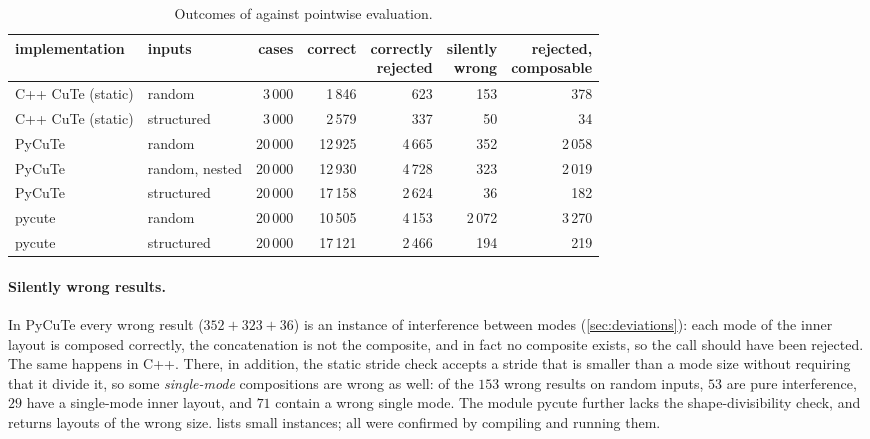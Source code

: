 \begin{table}[t]\centering\small
\begin{tabular}{@{}llrrrrr@{}}
\toprule
implementation & inputs & cases & correct & \shortstack{correctly\\rejected} & \shortstack{silently\\wrong} & \shortstack{rejected,\\composable}\\
\midrule
C++ CuTe (static) & random & 3\,000 & 1\,846 & 623 & 153 & 378\\
C++ CuTe (static) & structured & 3\,000 & 2\,579 & 337 & 50 & 34\\
PyCuTe & random & 20\,000 & 12\,925 & 4\,665 & 352 & 2\,058\\
PyCuTe & random, nested & 20\,000 & 12\,930 & 4\,728 & 323 & 2\,019\\
PyCuTe & structured & 20\,000 & 17\,158 & 2\,624 & 36 & 182\\
pycute & random & 20\,000 & 10\,505 & 4\,153 & 2\,072 & 3\,270\\
pycute & structured & 20\,000 & 17\,121 & 2\,466 & 194 & 219\\
\bottomrule
\end{tabular}
\caption{Outcomes of  against pointwise evaluation.}\label{tab:difftest}
\end{table}

\paragraph{Silently wrong results.}
In PyCuTe every wrong result ($352+323+36$) is an instance of interference between modes
(\cref{sec:deviations}): each mode of the inner layout is composed correctly, the concatenation
is not the composite, and in fact no composite exists, so the call should have been rejected.
The same happens in C++. There, in addition, the static stride check accepts a stride that is
smaller than a mode size without requiring that it divide it, so some \emph{single-mode}
compositions are wrong as well: of the $153$ wrong results on random inputs, $53$ are pure
interference, $29$ have a single-mode inner layout, and $71$ contain a wrong single mode. The
module pycute further lacks the shape-divisibility check, and returns layouts of the wrong size.
 lists small instances; all were confirmed by compiling and running them.

